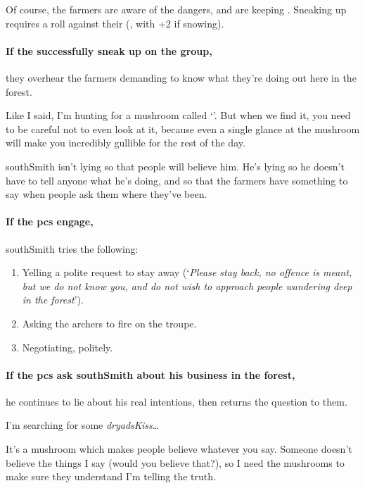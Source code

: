 Of course, the farmers are aware of the dangers, and are keeping .
Sneaking up requires a  roll against their  (\tn, with +2 if snowing).


\paragraph{If the successfully sneak up on the group,}
they overhear the farmers demanding to know what they're doing out here in the forest.

\begin{speechtext}
  Like I said, I'm hunting for a mushroom called `'.
  But when we find it, you need to be careful not to even look at it, because even a single glance at the mushroom will make you incredibly gullible for the rest of the day.
\end{speechtext}

\Gls{southSmith} isn't lying so that people will believe him.
He's lying so he doesn't have to tell anyone what he's doing, and so that the farmers have something to say when people ask them where they've been.

\paragraph{If the \glspl{pc} engage,}

\Gls{southSmith} tries the following:

\begin{enumerate}
  \item
  Yelling a polite request to stay away (`\textit{Please stay back, no offence is meant, but we do not know you, and do not wish to approach people wandering deep in the forest}').
  \item
  Asking the archers to fire on the troupe.
  \item
  Negotiating, politely.
\end{enumerate}

\paragraph{If the \glspl{pc} ask \gls{southSmith} about his business in the forest,}
he continues to lie about his real intentions, then returns the question to them.

\begin{speechtext}
  I'm searching for some \textit{\gls{dryadsKiss}}\ldots

  It's a mushroom which makes people believe whatever you say.
  Someone doesn't believe the things I say (would you believe that?), so I need the mushrooms to make sure they understand I'm telling the truth.
\end{speechtext}

